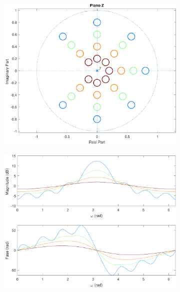 \documentclass[a4paper,11pt]{article}
\numberwithin{figure}{section}
\numberwithin{equation}{section}
\numberwithin{table}{section}
\theoremstyle{definition}
\begin{document}
\begin{figure}[ht]
\begin{subfigure}{0.44\textwidth}
		\includegraphics[width=\textwidth]{ex_3_pz_8}
	\end{subfigure}
	\begin{subfigure}{0.44\textwidth}
		\includegraphics[width=\textwidth]{ex_3_bode_8}
	\end{subfigure}\\
	\begin{subfigure}{0.44\textwidth}

\end{subfigure}
\end{figure}
\end{document}
